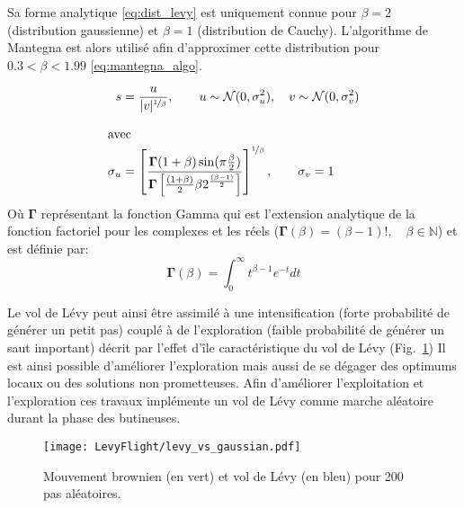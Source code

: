 Sa forme analytique \eqref{eq:dist_levy} est uniquement connue pour $\beta = 2$
(distribution gaussienne) et $\beta = 1$ (distribution de Cauchy).
L’algorithme de Mantegna \parencite{Mantegna19944677} est alors utilisé afin
d’approximer cette distribution pour $0.3 < \beta < 1.99$ \eqref{eq:mantegna_algo}.

\begin{align}\label{eq:mantegna_algo}
    s &= \frac{u}{\mathopen{|}v\mathclose{|}^{\nicefrac{1}{\beta}}}, \qquad u \sim \mathcal{N}(0, \sigma_{u}^{2}),
        \quad v \sim \mathcal{N}(0, \sigma_{v}^{2}) \\[1em]
    \shortintertext{avec}
    \sigma_{u} &= \left[ \frac{\mathbf{\Gamma}(1+\beta)\sin(\pi\frac{\beta}{2})}%
                             {\mathbf{\Gamma} \left[\frac{(1+\beta)}{2}\beta
                              2^{\frac{(\beta-1)}{2}}\right]}\right]^{\nicefrac{1}{\beta}},%
    \qquad \sigma_{v} = 1 \notag
\end{align}
Où $\mathbf{\Gamma}$ représentant la fonction Gamma qui est l’extension analytique de la
fonction factoriel pour les complexes et les réels ($\mathbf{\Gamma}(\beta) = (\beta -1)!,\quad \beta\in \mathbb{N}$)
et est définie par:
\begin{equation*}
  \mathbf{\Gamma}(\beta) = \int_{0}^{\infty} t^{\beta-1}e^{-t} dt
\end{equation*}

Le vol de Lévy peut ainsi être assimilé à une intensification (forte probabilité de générer un petit pas)
couplé à de l’exploration (faible probabilité de générer un saut important) décrit par
l’effet d’île caractéristique du vol de Lévy (Fig.~\ref{fig:levy_vs_gaussian})
Il est ainsi possible d’améliorer l’exploration mais aussi de se dégager des optimums
locaux ou des solutions non prometteuses. Afin d’améliorer l’exploitation et l’exploration
ces travaux implémente un vol de Lévy comme marche aléatoire durant la phase des butineuses.

\begin{figure}
    \begin{center}
        \texttt{[image: LevyFlight/levy\_vs\_gaussian.pdf]}
    \end{center}
    \caption{Mouvement brownien (en vert) et vol de Lévy (en bleu) pour 200 pas aléatoires.
             \label{fig:levy_vs_gaussian}}
\end{figure}
\FloatBarrier


